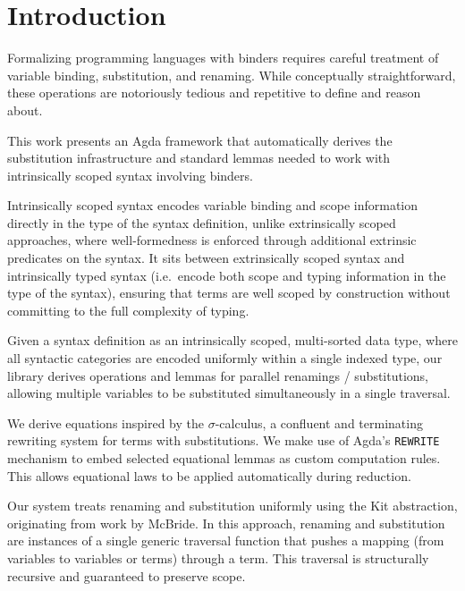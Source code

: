 \documentclass[screen,nonacm]{acmart}
\begin{document}
\maketitle

\section{Introduction}\label{sec:introduction}

Formalizing programming languages with binders requires careful treatment of
variable binding, substitution, and renaming. While conceptually
straightforward, these operations are notoriously tedious and repetitive to
define and reason about.

This work presents an Agda framework that automatically derives the
substitution infrastructure and standard lemmas needed to work with
intrinsically scoped syntax involving binders.

Intrinsically scoped syntax encodes variable binding and scope information
directly in the type of the syntax definition, unlike extrinsically scoped
approaches, where well-formedness is enforced through additional extrinsic
predicates on the syntax. It sits between extrinsically scoped syntax and
intrinsically typed syntax (i.e.\ encode both scope and typing information in
the type of the syntax), ensuring that terms are well scoped by construction
without committing to the full complexity of typing.

Given a syntax definition as an intrinsically scoped, multi-sorted data type,
where all syntactic categories are encoded uniformly within a single indexed
type, our library derives operations and lemmas for parallel renamings /
substitutions, allowing multiple variables to be substituted simultaneously in
a single traversal.

We derive equations inspired by the \(\sigma\)-calculus, a confluent and
terminating rewriting system for terms with substitutions. We make use of
Agda’s \texttt{REWRITE} mechanism to embed selected equational lemmas as custom
computation rules. This allows equational laws to be applied automatically
during reduction.

Our system treats renaming and substitution uniformly using the Kit
abstraction, originating from work by McBride. In this approach, renaming and
substitution are instances of a single generic traversal function that pushes a
mapping (from variables to variables or terms) through a term. This traversal
is structurally recursive and guaranteed to preserve scope.
\end{document}
